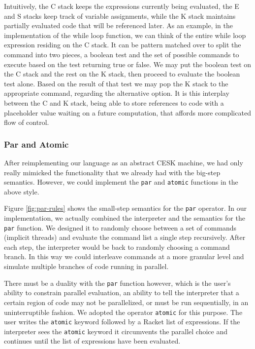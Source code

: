 Intuitively, the C stack keeps the expressions currently being evaluated, the E and S stacks keep track of variable assignments, while the K stack maintains partially evaluated code that will be referenced later.  As an example, in the implementation of the while loop function, we can think of the entire while loop expression residing on the C stack.  It can be pattern matched over to split the command into two pieces, a boolean test and the set of possible commands to execute based on the test returning true or false.  We may put the boolean test on the C stack and the rest on the K stack, then proceed to evaluate the boolean test alone.  Based on the result of that test we may pop the K stack to the appropriate command, regarding the alternative option.  It is this interplay between the C and K stack, being able to store references to code with a placeholder value waiting on a future computation, that affords more complicated flow of control.  

\subsubsection{Par and Atomic}
After reimplementing our language as an abstract CESK machine, we had only really mimicked the functionality that we already had with the big-step semantics.  However, we could implement the \texttt{par} and \texttt{atomic} functions in the above style.

Figure \ref{fig:par-rules} shows the small-step semantics for the \texttt{par} operator. In our implementation, we actually combined the interpreter and the semantics for the \texttt{par} function.  We designed it to randomly choose between a set of commands (implicit threads) and evaluate the command list a single step recursively.  After each step, the interpreter would be back to randomly choosing a command branch.  In this way we could interleave commands at a more granular level and simulate multiple branches of code running in parallel.

There must be a duality with the \texttt{par} function however, which is the user's ability to constrain parallel evaluation, an ability to tell the interpreter that a certain region of code may not be parallelized, or must be run sequentially, in an uninterruptible fashion.  We adopted the operator \texttt{atomic} for this purpose.  The user writes the \texttt{atomic} keyword followed by a Racket list of expressions.  If the interpreter sees the \texttt{atomic} keyword it circumvents the parallel choice and continues until the list of expressions have been evaluated.

